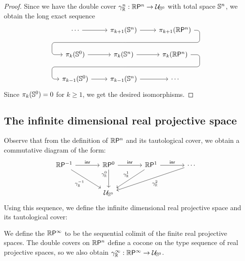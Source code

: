 \begin{proof}
Since we have the double cover $\tautfam[\R]{n}:\rprojective{n}\to\UU_{\sphere{0}}$ with total space $\sphere{n}$, we obtain the long exact sequence
\begin{equation*}
\begin{tikzcd}
  \cdots \arrow[r]
  & \pi_{k+1}(\sphere{n}) \arrow[r] \arrow[d, phantom, ""{coordinate, name=Z}]
  & \pi_{k+1}(\rprojective n) \arrow[dll, rounded corners,
      to path={ -- ([xshift=8.5ex]\tikztostart.center)
                |- (Z) [near end]\tikztonodes
                -| ([xshift=-8ex]\tikztotarget.center) -- (\tikztotarget)}] \\
  \pi_k(\sphere{0}) \arrow[r]
  & \pi_k(\sphere{n}) \arrow[r] \arrow[d, phantom, ""{coordinate, name=W}]
  & \pi_k(\rprojective n) \arrow[dll, rounded corners,
      to path={ -- ([xshift=8.5ex]\tikztostart.center)
                |- (W) [near end]\tikztonodes
                -| ([xshift=-8ex]\tikztotarget.center) -- (\tikztotarget)}] \\
  \pi_{k-1}(\sphere{0}) \arrow[r]
  & \pi_{k-1}(\sphere{n}) \arrow[r]
  & \cdots
\end{tikzcd}
\end{equation*}
Since $\pi_k({\sphere{0}})=0$ for $k\geq 1$, we get the desired isomorphisms.
\end{proof}

\subsection{The infinite dimensional real projective space}
\label{sec:idrp}

Observe that from the definition of $\rprojective{n}$ and its tautological 
cover, we obtain a commutative diagram of the form:
\begin{equation*}
\begin{tikzcd}[row sep=large,column sep=large]
\rprojective{-1} \arrow[r,"\inr"] \arrow[dr,swap,"{\tautfam[\R]{-1}}"] 
& \rprojective{0} \arrow[d,swap,near start,"{\tautfam[\R]{0}}"] \arrow[r,"\inr"] 
& \rprojective{1} \arrow[dl,swap,"{\tautfam[\R]{1}}"] \arrow[r,"\inr"] 
& \cdots \arrow[dll,"{\tautfam[\R]{2}}"]\\
& \UU_{\sphere{0}}
\end{tikzcd}
\end{equation*}
Using this sequence, we define the infinite dimensional real projective space
and its tautological cover:

\begin{defn}
We define the  $\rprojective{\infty}$ to be the sequential colimit of the finite real projective spaces. The double covers on $\rprojective{n}$ define a cocone on the type sequence of real projective spaces, so we also obtain $\tautfam[\R]{\infty}:\rprojective{\infty}\to \UU_{\sphere{0}}$. 
\end{defn}

